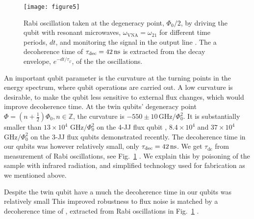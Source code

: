  \begin{figure}[h!]
   \texttt{[image: figure5]}
   \caption{Rabi oscillation taken at the degeneracy point, $ \Phi_0/2 $, by driving
     the qubit with resonant microwaves,  $\omega_{\text{VNA}} = \omega_{21}$ for different
     time  periods,  $  dt $,  and  monitoring  the  signal  in the  output  line
     \cite{rabi}.         The         a        decoherence         time        of
     $ \tau_{\text{dec}}  = 42\,\text{ns} $  is extracted from the  decay envelope,
     $ e^{-dt/\tau_\varphi} $, of the the oscillations. \label{fig:rabi}}
 \end{figure}
 An  important qubit  parameter is  the curvature  at the  turning points  in the
 energy spectrum,  where qubit operations  are carried  out.  A low  curvature is
 desirable, to  make the  qubit less  sensitive to  external flux  changes, which
 would  improve  decoherence   time.   At  the  twin   qubits'  degeneracy  point
 $   \Phi   =   (n   +   \frac{1}{2})\Phi_0,   n\in\mathbb{Z}   $,   the   curvature   is
 $   -550\pm10\,\text{GHz}/\Phi_0^2   $.    It   is   substantially   smaller   than
 $  13\times  10^4$ $  \text{GHz}/\Phi_0^2$  on  the  4-JJ flux  qubit  \cite{stern2014},
 $  8.4   \times  10^4$   \cite{zhu2010}  and  $   37\times  10^{4}$   $  \text{GHz}/\Phi_0^2$
 \cite{gustavsson2012}  on  the  3-JJ  flux qubits  demonstrated  recently.   The
 decoherence   time  in   our   qubits  was   however   relatively  small,   only
 $ \tau_\text{dec}  = 42\,\text{ns}  $.  We get  $\tau_\text{dc}$ from  measurement of
 Rabi  oscillations, see  Fig.~\ref{fig:rabi}  \cite{rabi}.  We  explain this  by
 poisoning of the sample with  infrared radiation, and simplified technology used
 for fabrication as we mentioned above.

 Despite  the twin  qubit have  a much  the decoherence  time in  our qubits  was
 relatively  small  This improved  robustness  to  flux  noise  is matched  by  a
 decoherence time  of , extracted  from Rabi oscillations  in Fig.~\ref{fig:rabi}
 \cite{rabi}.

